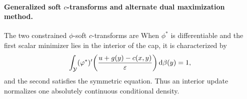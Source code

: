 \paragraph{\texorpdfstring{Generalized soft $c$-transforms and alternate dual maximization method.}{Generalized soft c-transforms and alternate dual maximization method.}}
The two constrained $\phi$-soft $c$-transforms are
When $\phi^*$ is differentiable and the first scalar minimizer lies in the interior of the cap, it is characterized by
\[
\int_{\mathcal{Y}}
(\varphi^*)'\!\left(\frac{u+g(y)-c(x,y)}{\varepsilon}\right)\mathrm{d}\beta(y)=1,
\]
and the second satisfies the symmetric equation. Thus an interior update normalizes one absolutely continuous conditional density.

